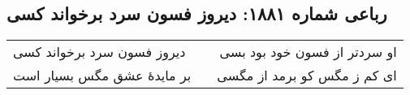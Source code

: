 \begin{center}
\section*{رباعی شماره ۱۸۸۱: دیروز فسون سرد برخواند کسی}
\label{sec:1881}
\begin{longtable}{l p{0.5cm} r}
دیروز فسون سرد برخواند کسی
&&
او سردتر از فسون خود بود بسی
\\
بر مایدهٔ عشق مگس بسیار است
&&
ای کم ز مگس کو برمد از مگسی
\\
\end{longtable}
\end{center}
